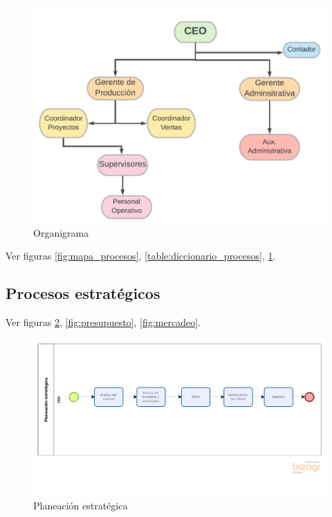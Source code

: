 \documentclass[11pt]{article}
\begin{document}
\begin{figure}[htbp]
\centering
\includegraphics[width=.9\linewidth]{./assets/build/organigrama.png}
\caption{\label{fig:organigrama}Organigrama}
\end{figure}

Ver figuras \ref{fig:mapa_procesos}, \ref{table:diccionario_procesos}, \ref{fig:organigrama}.

\subsection{Procesos estratégicos}

Ver figuras \ref{fig:planeacion}, \ref{fig:presupuesto}, \ref{fig:mercadeo}.
\begin{figure}[H]
\centering
\includegraphics[width=.9\linewidth]{./assets/build/planeacion.png}
\caption{\label{fig:planeacion}Planeación estratégica}
\end{figure}
\end{document}

